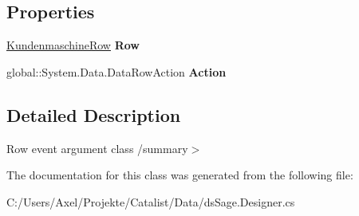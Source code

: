 \subsection*{Properties}
\begin{DoxyCompactItemize}
\item 
\hyperlink{class_products_1_1_data_1_1ds_sage_1_1_kundenmaschine_row}{Kundenmaschine\+Row} {\bfseries Row}\hypertarget{class_products_1_1_data_1_1ds_sage_1_1_kundenmaschine_row_change_event_aad116df73a012134b6abed6aefc20e28}{}\label{class_products_1_1_data_1_1ds_sage_1_1_kundenmaschine_row_change_event_aad116df73a012134b6abed6aefc20e28}

\item 
global\+::\+System.\+Data.\+Data\+Row\+Action {\bfseries Action}\hypertarget{class_products_1_1_data_1_1ds_sage_1_1_kundenmaschine_row_change_event_aaaa2a028278a063562d65cbbfddb6304}{}\label{class_products_1_1_data_1_1ds_sage_1_1_kundenmaschine_row_change_event_aaaa2a028278a063562d65cbbfddb6304}

\end{DoxyCompactItemize}


\subsection{Detailed Description}
Row event argument class /summary$>$ 

The documentation for this class was generated from the following file\+:\begin{DoxyCompactItemize}
\item 
C\+:/\+Users/\+Axel/\+Projekte/\+Catalist/\+Data/ds\+Sage.\+Designer.\+cs\end{DoxyCompactItemize}

